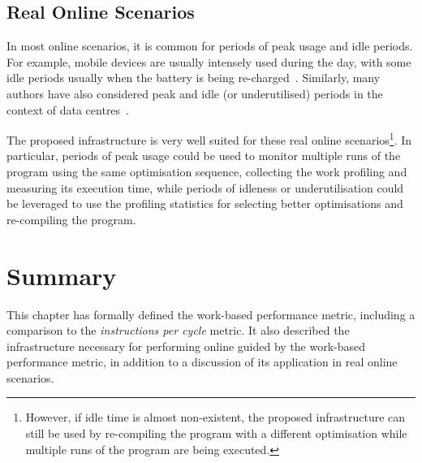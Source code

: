 \subsection{Real Online Scenarios}

In most online scenarios, it is common for periods of peak usage and idle periods.
For example, mobile devices are usually intensely used during the day, with some idle periods usually when the battery is being re-charged~\citep{mpeis16}.
Similarly, many authors have also considered peak and idle (or underutilised) periods in the context of data centres~\citep{armbrust10,chen12b}.

The proposed infrastructure is very well suited for these real online scenarios\footnote{
However, if idle time is almost non-existent, the proposed infrastructure can still be used by re-compiling the program with a different optimisation while multiple runs of the program are being executed.}.
In particular, periods of peak usage could be used to monitor multiple runs of the program using the same optimisation sequence, collecting the work profiling and measuring its execution time,
while periods of idleness or underutilisation could be leveraged to use the profiling statistics for selecting better optimisations and re-compiling the program.

\section{Summary}

This chapter has formally defined the work-based performance metric, including a comparison to the \textit{instructions per cycle} metric.
It also described the infrastructure necessary for performing online {\itercomp} guided by the work-based performance metric,
in addition to a discussion of its application in real online scenarios.
